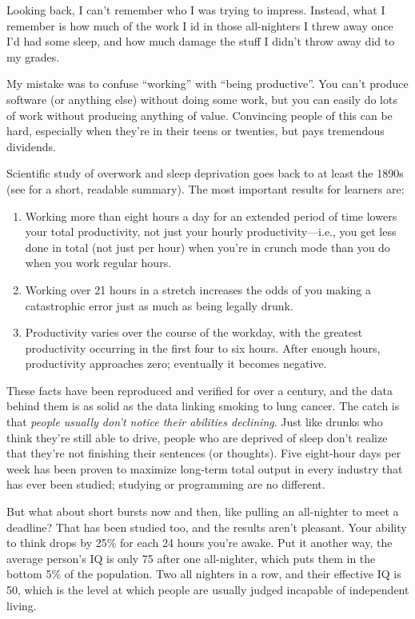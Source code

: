 Looking back, I can't remember who I was trying to impress.  Instead,
what I remember is how much of the work I id in those all-nighters I
threw away once I'd had some sleep, and how much damage the stuff I
didn't throw away did to my grades.

My mistake was to confuse ``working'' with ``being productive''.  You
can't produce software (or anything else) without doing some work, but
you can easily do lots of work without producing anything of value.
Convincing people of this can be hard, especially when they're in
their teens or twenties, but pays tremendous dividends.

Scientific study of overwork and sleep deprivation goes back to at
least the 1890s (see \cite{Robi2005} for a short, readable summary).
The most important results for learners are:

\begin{enumerate}

\item Working more than eight hours a day for an extended period of
  time lowers your total productivity, not just your hourly
  productivity---i.e., you get less done in total (not just per hour)
  when you're in crunch mode than you do when you work regular hours.

\item Working over 21 hours in a stretch increases the odds of you
  making a catastrophic error just as much as being legally drunk.

\item Productivity varies over the course of the workday, with the
  greatest productivity occurring in the first four to six hours.
  After enough hours, productivity approaches zero; eventually it
  becomes negative.

\end{enumerate}

These facts have been reproduced and verified for over a century, and
the data behind them is as solid as the data linking smoking to lung
cancer.  The catch is that \emph{people usually don't notice their
  abilities declining}.  Just like drunks who think they're still able
to drive, people who are deprived of sleep don't realize that they're
not finishing their sentences (or thoughts).  Five eight-hour days per
week has been proven to maximize long-term total output in every
industry that has ever been studied; studying or programming are no
different.

But what about short bursts now and then, like pulling an all-nighter
to meet a deadline?  That has been studied too, and the results aren't
pleasant.  Your ability to think drops by 25\% for each 24 hours
you're awake.  Put it another way, the average person's IQ is only 75
after one all-nighter, which puts them in the bottom 5\% of the
population.  Two all nighters in a row, and their effective IQ is 50,
which is the level at which people are usually judged incapable of
independent living.

